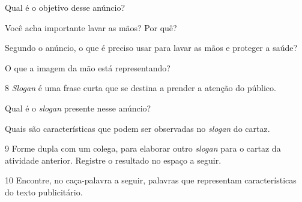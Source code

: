 \begin{escolha}[itemsep=-5pt]
\item Qual é o objetivo desse anúncio?

\item Você acha importante lavar as mãos? Por quê?


\pagebreak
\item Segundo o anúncio, o que é preciso usar para lavar as mãos e proteger a saúde?

\item O que a imagem da mão está representando?
\end{escolha}

\num{8} \emph{Slogan} é uma frase curta que se destina a prender a atenção do
público. 

\begin{escolha}
\item Qual é o \emph{slogan} presente nesse anúncio?

\item Quais são características que podem ser observadas no \emph{slogan} do cartaz. 
\end{escolha}

\num{9} Forme dupla com um colega, para elaborar outro \emph{slogan} para o cartaz da atividade anterior. Registre o resultado no espaço a seguir.


\begin{mdframed}[linewidth=2pt,linecolor=salmao,roundcorner=20pt]
\vspace{7cm}
\end{mdframed}

\pagebreak

\num{10} Encontre, no caça-palavra a seguir, palavras que representam
características do texto publicitário.

